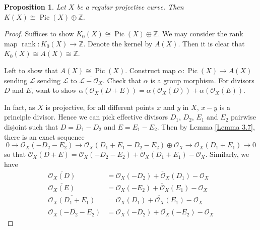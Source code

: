 \documentclass{ctexart}
\newtheorem{proposition}{Proposition}[section]
\newcommand{\rank}{\operatorname{rank}}
\newcommand{\picardscheme}{\operatorname{Pic}}
\begin{document}
\begin{proposition}
    Let $X$ be a regular projective curve.
    Then $K(X) \cong \picardscheme (X) \oplus \mathbb{Z}$.
    \label{Proposition 3.5}
\end{proposition}
\begin{proof}
    Suffices to show $K_{0}(X) \cong \picardscheme (X) \oplus \mathbb{Z}$.
    We may consider the rank map $\rank: K_{0}(X) \rightarrow \mathbb{Z}$.
    Denote the kernel by $A(X)$.
    Then it is clear that $K_{0}(X) \cong A(X) \cong \mathbb{Z}$.
    \par
    Left to show that $A(X) \cong \picardscheme (X)$.
    Construct map $\alpha: \picardscheme (X) \rightarrow A(X)$ sending $\mathcal{L}$ sending $\mathcal{L}$ to $\overline{\mathcal{L} - \mathcal{O}_{X}}$.
    Check that $\alpha$ is a group morphism.
    For divisors $D$ and $E$, want to show $\alpha(\mathcal{O}_{X}(D + E)) = \alpha(\mathcal{O}_{X}(D)) + \alpha(\mathcal{O}_{X}(E))$.
    \par
    In fact, as $X$ is projective, for all different points $x$ and $y$ in $X$, $x - y$ is a principle divisor.
    Hence we can pick effective divisors $D_{1}$, $D_{2}$, $E_{1}$ and $E_{2}$ pairwise disjoint such that $D = D_{1} - D_{2}$ and $E = E_{1} - E_{2}$.
    Then by Lemma \ref{Lemma 3.7}, there is an exact sequence
    \begin{equation}
        0 \longrightarrow \mathcal{O}_{X}(-D_{2} - E_{2}) \longrightarrow \mathcal{O}_{X}(D_{1} + E_{1} - D_{2} - E_{2}) \oplus \mathcal{O}_{X} \longrightarrow \mathcal{O}_{X}(D_{1} + E_{1}) \longrightarrow 0
    \end{equation}
    so that $\overline{\mathcal{O}_{X}(D + E)} = \overline{\mathcal{O}_{X}(-D_{2} - E_{2}) + \mathcal{O}_{X}(D_{1} + E_{1}) - \mathcal{O}_{X}}$.
    Similarly, we have
    \begin{equation}
        \begin{split}
            \overline{\mathcal{O}_{X}(D)} & = \overline{\mathcal{O}_{X}(-D_{2}) + \mathcal{O}_{X}(D_{1}) - \mathcal{O}_{X}} \\
            \overline{\mathcal{O}_{X}(E)} & = \overline{\mathcal{O}_{X}(-E_{2}) + \mathcal{O}_{X}(E_{1}) - \mathcal{O}_{X}} \\
            \overline{\mathcal{O}_{X}(D_{1} + E_{1})} & = \overline{\mathcal{O}_{X}(D_{1}) + \mathcal{O}_{X}(E_{1}) - \mathcal{O}_{X}} \\
            \overline{\mathcal{O}_{X}(-D_{2} - E_{2})} & = \overline{\mathcal{O}_{X}(-D_{2}) + \mathcal{O}_{X}(-E_{2}) - \mathcal{O}_{X}}

\end{split}
\end{equation}
\end{proof}
\end{document}
